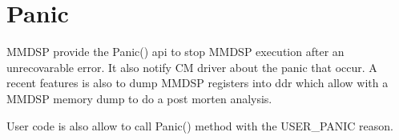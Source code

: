 \chapter{Panic}
MMDSP provide the Panic() api to stop MMDSP execution after an unrecovarable
error. It also notify CM driver about the panic that occur. A recent features is
also to dump MMDSP registers into ddr which allow with a MMDSP memory dump to do
a post morten analysis.

User code is also allow to call Panic() method with the USER\_PANIC reason.
